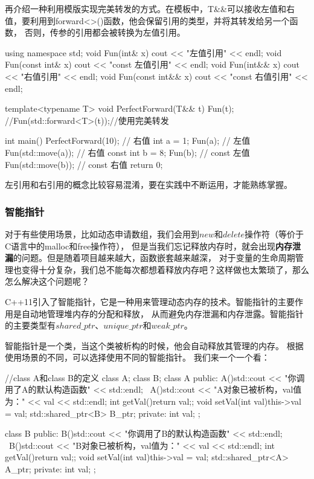 再介绍一种利用模版实现完美转发的方式。在模板中，T\&\&可以接收左值和右值，要利用到forward<>()函数，他会保留引用的类型，并将其转发给另一个函数，
否则，传参的引用都会被转换为左值引用。

\begin{tcode}
using namespace std;
void Fun(int& x) { cout << "左值引用" << endl; }
void Fun(const int& x) { cout << "const 左值引用" << endl; }
void Fun(int&& x) { cout << "右值引用" << endl; }
void Fun(const int&& x) { cout << "const 右值引用" << endl; }

template<typename T>
void PerfectForward(T&& t)
{
    Fun(t);
    //Fun(std::forward<T>(t));//使用完美转发
}

int main() {
    PerfectForward(10);           // 右值
    int a = 1;
    Fun(a);            // 左值
    Fun(std::move(a)); // 右值
    const int b = 8;
    Fun(b);      // const 左值
    Fun(std::move(b)); // const 右值
    return 0;
}
\end{tcode}
左引用和右引用的概念比较容易混淆，要在实践中不断运用，才能熟练掌握。

\subsubsection{智能指针}
对于有些使用场景，比如动态申请数组，我们会用到$new$和$delete$操作符（等价于C语言中的malloc和free操作符），
但是当我们忘记释放内存时，就会出现\textbf{内存泄漏}的问题。但是随着项目越来越大，函数嵌套越来越深，
对于变量的生命周期管理也变得十分复杂，我们总不能每次都想着释放内存吧？这样做也太繁琐了，那么怎么解决这个问题呢？

C++11引入了智能指针，它是一种用来管理动态内存的技术。智能指针的主要作用是自动地管理堆内存的分配和释放，
从而避免内存泄漏和内存泄露。智能指针的主要类型有\textbf{$shared\_ptr$}、\textbf{$unique\_ptr$}和\textbf{$weak\_ptr$}。

智能指针是一个类，当这个类被析构的时候，他会自动释放其管理的内存。
根据使用场景的不同，可以选择使用不同的智能指针。
我们来一个一个看：

\begin{tcode}
//class A和class B的定义
class A;
class B;
class A{
public:
    A(){std::cout << "你调用了A的默认构造函数" << std::endl;}
    ~A(){std::cout << "A对象已被析构，val值为：" << val << std::endl;}
    int getVal(){return val;};
    void setVal(int val){this->val = val;}
    std::shared_ptr<B> B_ptr;
private:
    int val;
};

class B{
public:
    B(){std::cout << "你调用了B的默认构造函数" << std::endl;}
    ~B(){std::cout << "B对象已被析构，val值为：" << val << std::endl;}
    int getVal(){return val;};
    void setVal(int val){this->val = val;}
    std::shared_ptr<A> A_ptr;
private:
    int val;    
};
\end{tcode}

